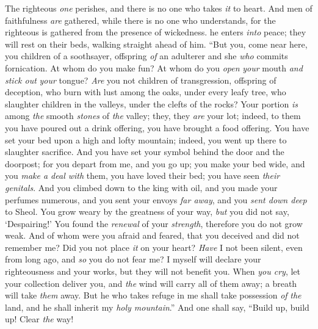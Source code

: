 \begin{biblechapter} %
 The righteous \textit{one} perishes, and there is no one who takes \textit{it} to heart. 
And men of faithfulness \textit{are} gathered, while there is no one who understands, 
for the righteous is gathered from the presence of wickedness.
\verse he enters \textit{into} peace; 
they will rest on their beds, 
walking straight ahead of him.
\verse “But you, come near here, you children of a soothsayer, 
offspring \textit{of} an adulterer and she \textit{who} commits fornication.
\verse At whom do you make fun? 
At whom do you \textit{open} \textit{your} mouth \textit{and} \textit{stick out} \textit{your} tongue? 
\textit{Are} you not children of transgression, 
offspring of deception,
\verse who burn with lust among the oaks, 
under every leafy tree, 
who slaughter children in the valleys, 
under the clefts of the rocks?
\verse Your portion \textit{is} among \textit{the} smooth \textit{stones} of \textit{the} valley; 
they, they \textit{are} your lot; 
indeed, to them you have poured out a drink offering, 
you have brought a food offering.
\verse You have set your bed upon a high and lofty mountain; 
indeed, you went up there to slaughter sacrifice.
\verse And you have set your symbol behind the door and the doorpost; 
for you depart from me, and you go up; 
you make your bed wide, and you \textit{make a deal with} them, 
you have loved their bed; you have seen \textit{their} \textit{genitals}.
\verse And you climbed down to the king with oil, 
and you made your perfumes numerous, 
and you sent your envoys \textit{far away}, 
and you \textit{sent down deep} to Sheol.
\verse You grow weary by the greatness of your way, 
\textit{but} you did not say, ‘Despairing!’ 
You found the \textit{renewal} of your \textit{strength}, 
therefore you do not grow weak.
\verse And of whom were you afraid and feared, that you deceived 
and did not remember me? 
Did you not place \textit{it} on your heart? 
\textit{Have} I not been silent, even from long ago, 
and \textit{so} you do not fear me?
\verse I myself will declare your righteousness and your works, 
but they will not benefit you.
\verse When \textit{you cry}, let your collection deliver you, 
and \textit{the} wind will carry all of them away; 
a breath will take \textit{them} away. 
But he who takes refuge in me shall take possession \textit{of} \textit{the} land, 
and he shall inherit my \textit{holy mountain}.”
 And one shall say, “Build up, build up! Clear \textit{the} way! 

\end{biblechapter}

